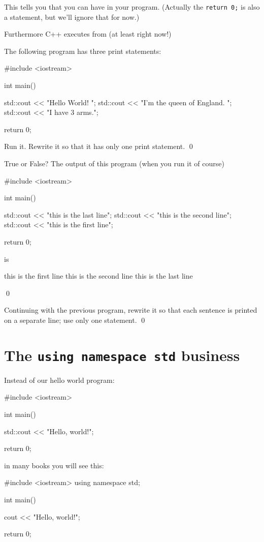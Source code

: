 This tells you that you can have 
in your program. (Actually the \verb!return 0;! is also a statement, but we'll ignore that for now.)

Furthermore C++ executes from 
(at least right now!)


\begin{ex}
The following program has three print statements: 
\begin{console}
#include <iostream>

int main()
{
    std::cout << "Hello World! ";
    std::cout << "I'm the queen of England. ";
    std::cout << "I have 3 arms.";

    return 0;
}
\end{console}
Run it. Rewrite it so that it has only one print statement. 
\qed
\end{ex}


\begin{ex}
True or False? The output of this program (when you run it of course)
\begin{console}
#include <iostream>

int main()
{
    std::cout << "this is the last line\n";
    std::cout << "this is the second line\n";
    std::cout << "this is the first line\n";

    return 0;
}
\end{console}
is
\begin{console}
this is the first line
this is the second line
this is the last line
\end{console}
\qed
\end{ex}


\begin{ex}
Continuing with the previous program, 
rewrite it so that each sentence is printed on a separate line; use only one statement.
\qed
\end{ex}



\newpage\section{The \texttt{using namespace std} business}

Instead of our hello world program:
\begin{console}
#include <iostream>

int main()
{
    std::cout << "Hello, world!\n";

    return 0;
}
\end{console}
in many books you will see this:
\begin{console}
#include <iostream>
using namespace std;

int main()
{
    cout << "Hello, world!\n";

    return 0;
}
\end{console}

